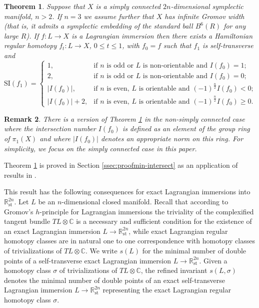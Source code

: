 \documentclass[reqno,11pt]{amsart}
\numberwithin{equation}{section}
\theoremstyle{my}
\theoremstyle{my}
\newtheorem{thm}{Theorem}[section]
\theoremstyle{your}
\newtheorem{Remark}[thm]{Remark}
\newcommand{\R}{\mathbb{R}}
\newcommand{\C}{\mathbb{C}}
\newcommand{\st}{\mathrm{st}}
\newcommand{\SI}{\mathrm{SI}}
\begin{document}
\begin{thm}\label{thm:min-intersect}
Suppose that $X$ is a simply connected $2n$-dimensional symplectic manifold, $n>2$. If $n=3$ we assume further that $X$ has infinite Gromov width (that is, it admits a symplectic embedding of the standard ball $B^6(R)$ for any large $R$). If $f\colon L\to X$ is a Lagrangian immersion then there exists a Hamiltonian regular homotopy $f_t\colon L\to X$, $0\le t\le 1$, with $f_0=f$ such that $f_1$ is self-transverse and 
\[
\SI(f_1) =
\begin{cases}  
1,&  \text{if $n$ is odd or $L$ is non-orientable and $I(f_0)=1$};\\
2,&  \text{if $n$ is odd or $L$ is non-orientable and $I(f_0)=0$};\\
|I(f_0)|,& \text{if $n$ is even,  $L$ is orientable and $(-1)^{\frac n2}I({f_0})<0$};\\
|I(f_0)|+2,& \text{if $n$ is even,  $L$ is orientable and $(-1)^{\frac n2}I({f_0})\ge 0$.}
\end{cases}
\]
\end{thm}
\begin{Remark}
There is a version of Theorem \ref{thm:min-intersect} in the non-simply connected case where  the intersection number $I(f_0)$ is defined as an element of the group ring of $\pi_1(X)$ and where $|I(f_0)|$ denotes an appropriate norm on this ring. For simplicity, we focus on the simply connected case in this paper.
\end{Remark}  
Theorem \ref{thm:min-intersect} is proved in Section \ref{ssec:proofmin-intersect} as an application of results in \cite{EliMur}. 

This result has the following consequences for  exact Lagrangian immersions into $\R^{2n}_\st$.  
Let $L$ be an $n$-dimensional closed manifold. Recall that according to Gromov's $h$-principle for Lagrangian immersions the triviality of the complexified tangent bundle $TL\otimes\C$ is a necessary and sufficient condition for the existence of an exact Lagrangian immersion $L\to\R^{2n}_\st$, while exact Lagrangian regular homotopy classes are in natural one to one correspondence with homotopy classes of trivializations of $TL\otimes\C$. We write $s(L)$ for the minimal number of double points of a self-transverse exact Lagrangian immersion $L\to\R^{2n}_{\st}$. Given a homotopy class $\sigma$ of trivializations of $TL\otimes\C$, the refined invariant $s(L,\sigma)$ denotes the minimal number of double points of an exact self-transverse Lagrangian immersion $L\to\R^{2n}_{\st}$ representing the exact Lagrangian regular homotopy class $\sigma$.
 
\end{document}
